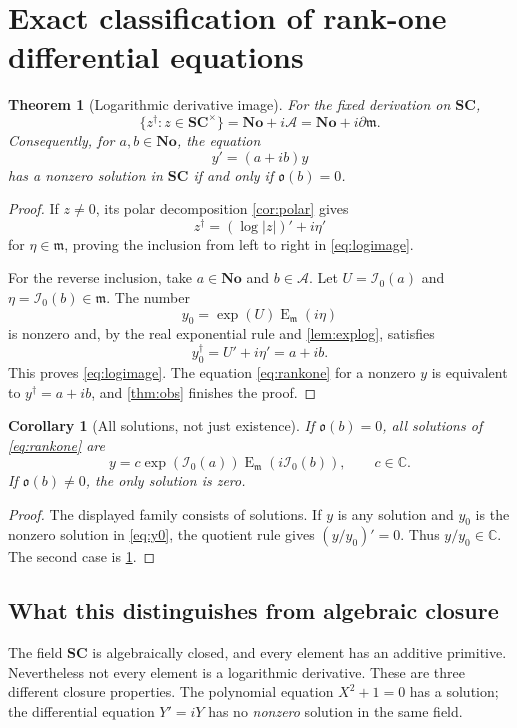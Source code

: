 \documentclass[11pt,letterpaper]{article}
\numberwithin{equation}{section}
\newtheorem{theorem}{Theorem}[section]
\newtheorem{corollary}[corollary]{Corollary}
\theoremstyle{definition}
\theoremstyle{remark}
\newcommand{\No}{\mathbf{No}}
\newcommand{\SC}{\mathbf{SC}}
\newcommand{\C}{\mathbb C}
\newcommand{\mm}{\mathfrak m}
\newcommand{\ARate}{\mathcal A}
\newcommand{\der}{\partial}
\newcommand{\Em}{\operatorname{E}_{\mm}}
\newcommand{\Izero}{\mathcal I_0}
\newcommand{\Obs}{\mathfrak o}
\begin{document}
\section{Exact classification of rank-one differential equations}\label{sec:rankone}

\begin{theorem}[Logarithmic derivative image]\label{thm:logimage}
For the fixed derivation on $\SC$,
\begin{equation}\label{eq:logimage}
 \{z^\dagger:z\in\SC^\times\}=\No+i\ARate=\No+i\der\mm.
\end{equation}
Consequently, for $a,b\in\No$, the equation
\begin{equation}\label{eq:rankone}
 y'=(a+ib)y
\end{equation}
has a nonzero solution in $\SC$ if and only if $\Obs(b)=0$.
\end{theorem}
\begin{proof}
If $z\ne0$, its polar decomposition \cref{cor:polar} gives
\[
 z^\dagger=(\log|z|)'+i\eta'
\]
for $\eta\in\mm$, proving the inclusion from left to right in \eqref{eq:logimage}.

For the reverse inclusion, take $a\in\No$ and $b\in\ARate$. Let $U=\Izero(a)$ and $\eta=\Izero(b)\in\mm$. The number
\begin{equation}\label{eq:y0}
 y_0=\exp(U)\Em(i\eta)
\end{equation}
is nonzero and, by the real exponential rule and \cref{lem:explog}, satisfies
\[
 y_0^\dagger=U'+i\eta'=a+ib.
\]
This proves \eqref{eq:logimage}. The equation \eqref{eq:rankone} for a nonzero $y$ is equivalent to $y^\dagger=a+ib$, and \cref{thm:obs} finishes the proof.
\end{proof}

\begin{corollary}[All solutions, not just existence]\label{cor:allrankone}
If $\Obs(b)=0$, all solutions of \eqref{eq:rankone} are
\[
 y=c\exp(\Izero(a))\Em(i\Izero(b)),\qquad c\in\C.
\]
If $\Obs(b)\ne0$, the only solution is zero.
\end{corollary}
\begin{proof}
The displayed family consists of solutions. If $y$ is any solution and $y_0$ is the nonzero solution in \eqref{eq:y0}, the quotient rule gives $(y/y_0)'=0$. Thus $y/y_0\in\C$. The second case is \cref{thm:logimage}.
\end{proof}

\subsection{What this distinguishes from algebraic closure}
The field $\SC$ is algebraically closed, and every element has an additive primitive. Nevertheless not every element is a logarithmic derivative. These are three different closure properties. The polynomial equation $X^2+1=0$ has a solution; the differential equation $Y'=iY$ has no \emph{nonzero} solution in the same field.
\end{document}
